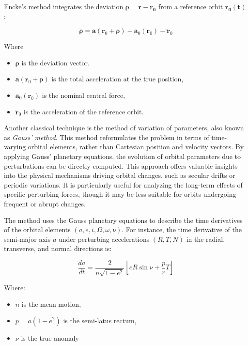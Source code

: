 \documentclass[letterpaper, paper,11pt]{AAS}
\begin{document}
Encke’s method integrates the deviation $\boldsymbol{\rho}=\mathbf{r}-\mathbf{r_0}$ from a reference orbit $\mathbf{r_0(t)}$:

\begin{equation}
\ddot{\boldsymbol{\rho}} = \mathbf{a}(\mathbf{r}_0 + \boldsymbol{\rho}) - \mathbf{a}_0(\mathbf{r}_0) - \ddot{\mathbf{r}}_0
\end{equation}

Where

\begin{itemize}
    \item $\boldsymbol{\rho}$ is the deviation vector.
    \item $\mathbf{a}(\mathbf{r}_0 + \boldsymbol{\rho})$ is the total acceleration at the true position,
    \item $\mathbf{a}_0(\mathbf{r}_0)$ is the nominal central force,
    \item $\ddot{\mathbf{r}}_0$ is the acceleration of the reference orbit.
\end{itemize}

Another classical technique is the method of variation of parameters, also known as \textit{Gauss’ method}. This method reformulates the problem in terms of time-varying orbital elements, rather than Cartesian position and velocity vectors. By applying Gauss’ planetary equations, the evolution of orbital parameters due to perturbations can be directly computed. This approach offers valuable insights into the physical mechanisms driving orbital changes, such as secular drifts or periodic variations. It is particularly useful for analyzing the long-term effects of specific perturbing forces, though it may be less suitable for orbits undergoing frequent or abrupt changes.\cite{montenbruck_satellite_2000} 

The method uses the Gauss planetary equations to describe the time derivatives of the orbital elements $(a,e,i,\Omega,\omega,\nu)$. For instance, the time derivative of the semi-major axis $a$ under perturbing accelerations $(R,T,N)$ in the radial, transverse, and normal directions is:

\begin{equation}
\frac{da}{dt} = \frac{2}{n \sqrt{1 - e^2}} \left[ e R \sin \nu + \frac{p}{r} T \right]
\end{equation}

Where:

\begin{itemize}
    \item $n$ is the mean motion,
    \item $p=a(1-e^2)$ is the semi-latus rectum,
    \item $\nu$ is the true anomaly
\end{itemize}
\end{document}
